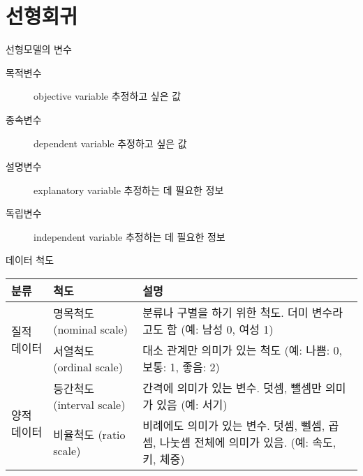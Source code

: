 \documentclass[10pt,t]{beamer}
\begin{document}
\section{선형회귀}

\begin{frame}[fragile] {선형모델의 변수}
    \begin{description}
        \item[목적변수] objective variable 추정하고 싶은 값
        \item[종속변수] dependent variable 추정하고 싶은 값
        \item[설명변수] explanatory variable 추정하는 데 필요한 정보
        \item[독립변수] independent variable 추정하는 데 필요한 정보
    \end{description}
\end{frame}

\begin{frame}[fragile] {데이터 척도}
    \begin{tabular}{p{5em} | p{5em} |p{6cm} }
        분류 & 척도 & 설명 \\ \hline
        \multirow{2}{*}{질적 데이터} & 명목척도 (nominal scale) & 분류나 구별을 하기 위한 척도. 더미 변수라고도 함 (예: 남성 0, 여성 1) \\ \cline{2-3}
        & 서열척도 (ordinal scale) & 대소 관계만 의미가 있는 척도 (예: 나쁨: 0, 보통: 1, 좋음: 2)\\ \hline
        \multirow{2}{*}{양적 데이터} & 등간척도 (interval scale) & 간격에 의미가 있는 변수. 덧셈, 뺄셈만 의미가 있음 (예: 서기)\\ \cline{2-3}
        & 비율척도 (ratio scale) & 비례에도 의미가 있는 변수. 덧셈, 뻴셈, 곱셈, 나눗셈 전체에 의미가 있음. (예: 속도, 키, 체중)\\ 
    \end{tabular}
\end{frame}
\end{document}
